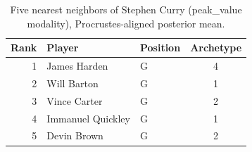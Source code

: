 \begin{table}[htbp]
  \centering\small
  \begin{tabular}{rllc}
    \toprule
    Rank & Player & Position & Archetype \\
    \midrule
    1 & James Harden & G & 4 \\
    2 & Will Barton & G & 1 \\
    3 & Vince Carter & G & 2 \\
    4 & Immanuel Quickley & G & 1 \\
    5 & Devin Brown & G & 2 \\
    \bottomrule
  \end{tabular}
  \caption{Five nearest neighbors of Stephen Curry (peak_value modality), Procrustes-aligned posterior mean.}
  \label{tab:Stephen_Curry_neighbors_peak_value}
\end{table}


